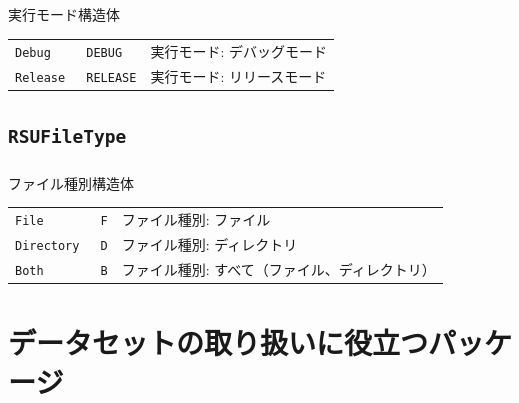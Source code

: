\paragraph{\DocStrDescription}実行モード構造体
\begin{center}
{\footnotesize
\begin{xltabular}{\textwidth}{|p{5truecm}|p{2truecm}|X|}
\hline
\thead{\DocStrHeaderStructMemberName}&\thead{\DocStrHeaderStructMemberValue}&\thead{\DocStrDescription}\\
\hline
\hline
\texttt{Debug}&\texttt{	DEBUG}&実行モード: デバッグモード\\
\hline
\texttt{Release}&\texttt{	RELEASE}&実行モード: リリースモード\\
\hline
\end{xltabular}
}
\end{center}
\section{\texttt{RSUFileType}}
\paragraph{\DocStrDescription}ファイル種別構造体
\begin{center}
{\footnotesize
\begin{xltabular}{\textwidth}{|p{5truecm}|p{2truecm}|X|}
\hline
\thead{\DocStrHeaderStructMemberName}&\thead{\DocStrHeaderStructMemberValue}&\thead{\DocStrDescription}\\
\hline
\hline
\texttt{File}&\texttt{	F}&ファイル種別: ファイル\\
\hline
\texttt{Directory}&\texttt{	D}&ファイル種別: ディレクトリ\\
\hline
\texttt{Both}&\texttt{	B}&ファイル種別: すべて（ファイル、ディレクトリ）\\
\hline
\end{xltabular}
}
\end{center}
 
\chapter{データセットの取り扱いに役立つパッケージ}\label{sec:Cate_DataHandling}
